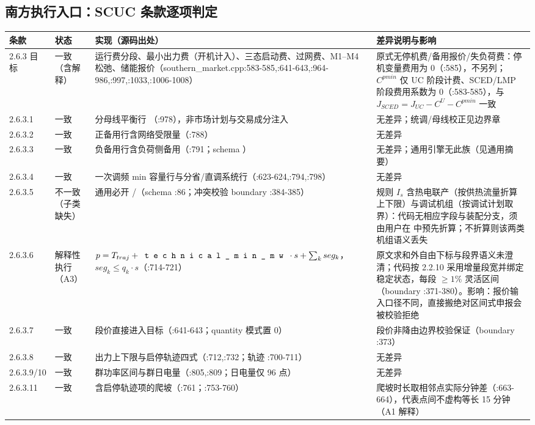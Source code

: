 \subsection{南方执行入口：SCUC 条款逐项判定}
\begin{center}\scriptsize
\begin{longtable}{@{}L{1.7cm}L{2.2cm}L{4.6cm}L{6.6cm}@{}}
\toprule 条款 & 状态 & 实现（源码出处） & 差异说明与影响\\\midrule
{}.3 目标 & 一致（含解释） & 运行费分段、最小出力费（开机计入）、三态启动费、过网费、M1--M4 松弛、储能报价（southern\_market.cpp:583-585,:641-643,:964-986,:997,:1033,:1006-1008） & 原式无停机费/备用报价/失负荷费：停机变量费用为 0（:585），不另列；$C^{pmin}$ 仅 UC 阶段计费、SCED/LMP 阶段费用系数为 0（:583-585），与 $J_{SCED}=J_{UC}-C^U-C^{pmin}$ 一致\\
2.6.3.1 & 一致 & 分母线平衡行 （:978），非市场计划与交易成分注入 & 无差异；统调/母线校正见边界章\\
2.6.3.2 & 一致 & 正备用行含网络受限量（:788） & 无差异\\
2.6.3.3 & 一致 & 负备用行含负荷侧备用（:791；schema ） & 无差异；通用引擎无此族（见通用摘要）\\
2.6.3.4 & 一致 & 一次调频 min 容量行与分省/直调系统行（:623-624,:794,:798） & 无差异\\
2.6.3.5 & 不一致（子类缺失） & 通用必开 /（schema :86；冲突校验 boundary :384-385） & 规则 $I_s$ 含热电联产（按供热流量折算上下限）与调试机组（按调试计划取界）：代码无相应字段与装配分支，须由用户在  中预先折算；不折算则该两类机组语义丢失\\
2.6.3.6 & 解释性执行（A3） & $p=T_{traj}+\fld{technical\_min\_mw}\cdot s+\sum_k seg_k$，$seg_k\le q_k\cdot s$（:714-721） & 原文求和外自由下标与段界语义未澄清；代码按 2.2.10 采用增量段宽并绑定稳定状态，每段 $\ge1\%$ 灵活区间（boundary :371-380）。影响：报价输入口径不同，直接搬绝对区间式申报会被校验拒绝\\
2.6.3.7 & 一致 & 段价直接进入目标（:641-643；quantity 模式置 0） & 段价非降由边界校验保证（boundary :373）\\
2.6.3.8 & 一致 & 出力上下限与启停轨迹四式（:712,:732；轨迹 :700-711） & 无差异\\
2.6.3.9/10 & 一致 & 群功率区间与群日电量（:805,:809；日电量仅 96 点） & 无差异\\
2.6.3.11 & 一致 & 含启停轨迹项的爬坡（:761；:753-760） & 爬坡时长取相邻点实际分钟差（:663-664），代表点间不虚构等长 15 分钟（A1 解释）\\

\end{longtable}
\end{center}
